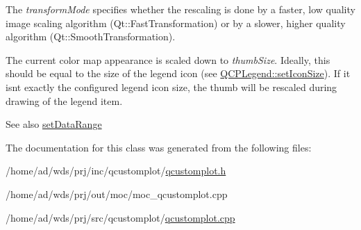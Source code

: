 The {\itshape transform\+Mode} specifies whether the rescaling is done by a faster, low quality image scaling algorithm (Qt\+::\+Fast\+Transformation) or by a slower, higher quality algorithm (Qt\+::\+Smooth\+Transformation).

The current color map appearance is scaled down to {\itshape thumb\+Size}. Ideally, this should be equal to the size of the legend icon (see \hyperlink{class_q_c_p_legend_a8b0740cce488bf7010da6beda6898984}{Q\+C\+P\+Legend\+::set\+Icon\+Size}). If it isn\textquotesingle{}t exactly the configured legend icon size, the thumb will be rescaled during drawing of the legend item.

\begin{DoxySeeAlso}{See also}
\hyperlink{class_q_c_p_color_map_a980b42837821159786a85b4b7dcb8774}{set\+Data\+Range} 
\end{DoxySeeAlso}


The documentation for this class was generated from the following files\+:\begin{DoxyCompactItemize}
\item 
/home/ad/wds/prj/inc/qcustomplot/\hyperlink{qcustomplot_8h}{qcustomplot.\+h}\item 
/home/ad/wds/prj/out/moc/moc\+\_\+qcustomplot.\+cpp\item 
/home/ad/wds/prj/src/qcustomplot/\hyperlink{qcustomplot_8cpp}{qcustomplot.\+cpp}\end{DoxyCompactItemize}
